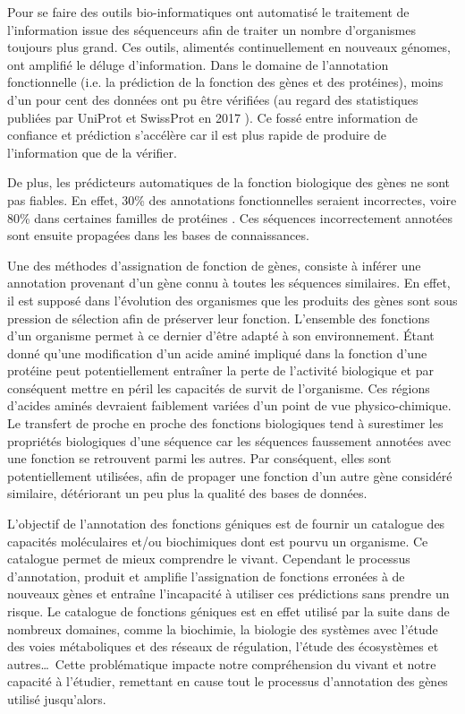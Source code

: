 \begin{refsegment}
Pour se faire des outils bio-informatiques ont automatisé le traitement de l'information issue des séquenceurs afin de traiter un nombre d'organismes toujours plus grand. Ces outils, alimentés continuellement en nouveaux génomes, ont amplifié le déluge d'information. Dans le domaine de l'annotation fonctionnelle (i.e. la prédiction de la fonction des gènes et des protéines), moins d'un pour cent des données ont pu être vérifiées (au regard des statistiques publiées par UniProt et SwissProt en 2017 \parencites{uniprot_stat}{expasy_stat} ). Ce fossé entre information de confiance et prédiction s'accélère car il est plus rapide de produire de l'information que de la vérifier.

De plus, les prédicteurs automatiques de la fonction biologique des gènes ne sont pas fiables. En effet, 30\% des annotations fonctionnelles seraient incorrectes, voire 80\% dans certaines familles de protéines \parencites{devos2001intrinsic}{schnoes2009annotation}. Ces séquences incorrectement annotées sont ensuite propagées dans les bases de connaissances.

Une des méthodes d'assignation de fonction de gènes, consiste à inférer une annotation provenant d'un gène connu à toutes les séquences similaires. En effet, il est supposé dans l’évolution des organismes que les produits des gènes sont sous pression de sélection afin de préserver leur fonction. L'ensemble des fonctions d'un organisme permet à ce dernier d'être adapté à son environnement. Étant donné qu'une modification d'un acide aminé impliqué dans la fonction d’une protéine peut potentiellement entraîner la perte de l'activité biologique et par conséquent mettre en péril les capacités de survit de l'organisme. Ces régions d'acides aminés devraient faiblement variées d'un point de vue physico-chimique. Le transfert de proche en proche des fonctions biologiques tend à surestimer les propriétés biologiques d'une séquence car les séquences faussement annotées avec une fonction se retrouvent parmi les autres. Par conséquent, elles sont potentiellement utilisées, afin de propager une fonction d'un autre gène considéré similaire, détériorant un peu plus la qualité des bases de données.

L'objectif de l'annotation des fonctions géniques est de fournir un catalogue des capacités moléculaires et/ou biochimiques dont est pourvu un organisme. Ce catalogue permet de mieux comprendre le vivant. Cependant le processus d'annotation, produit et amplifie l'assignation de fonctions erronées à de nouveaux gènes et entraîne l'incapacité à utiliser ces prédictions sans prendre un risque. Le catalogue de fonctions géniques est en effet utilisé par la suite dans de nombreux domaines, comme la biochimie, la biologie des systèmes avec l’étude des voies métaboliques et des réseaux de régulation, l'étude des écosystèmes et autres\ldots~Cette problématique impacte notre compréhension du vivant et notre capacité à l'étudier, remettant en cause tout le processus d'annotation des gènes utilisé jusqu'alors.


\end{refsegment}
